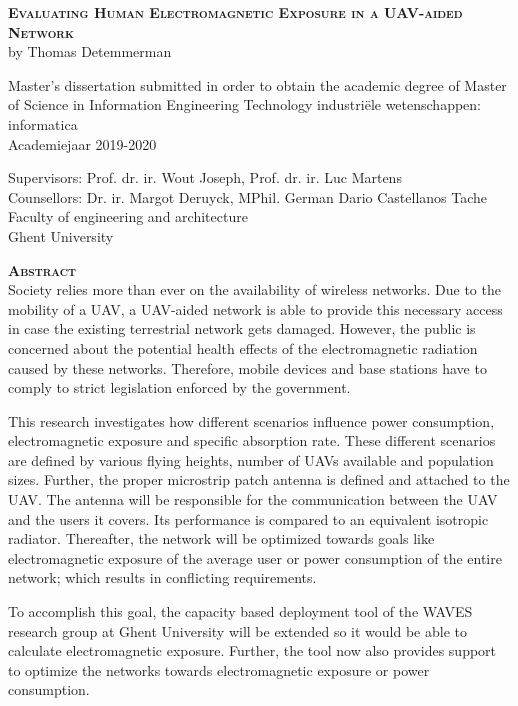 \begin{center}
\textsc{\textbf{\Huge Evaluating Human Electromagnetic Exposure in a UAV-aided Network}}\\
by Thomas Detemmerman

Master's dissertation submitted in order to obtain the academic degree of Master of Science in Information Engineering Technology
industri\"ele wetenschappen: informatica\\
Academiejaar 2019-2020

Supervisors: Prof. dr. ir. Wout Joseph, Prof. dr. ir. Luc Martens\\
Counsellors: Dr. ir. Margot Deruyck, MPhil. German Dario Castellanos Tache\\
Faculty of engineering and architecture\\
Ghent University
\end{center}
\textsc{\textbf{\LARGE Abstract}}\\
Society relies more than ever on the availability of wireless networks.
Due to the mobility of a UAV, a UAV-aided network is able to provide this necessary access in case the existing terrestrial network gets damaged.
However,  the public is 
concerned about the potential health effects of the electromagnetic radiation caused by these networks.
Therefore, mobile devices and base stations have to comply to strict legislation enforced by the government.

This research investigates how different scenarios influence power consumption, electromagnetic exposure and specific absorption rate.
These different scenarios are defined by various flying heights, number of UAVs available and population sizes. Further, 
the proper microstrip patch antenna is defined and attached to the UAV. 
The antenna will be responsible for the communication between the UAV and the users it covers.
Its performance is compared to  
an equivalent isotropic radiator.
Thereafter, the network will be optimized towards goals like electromagnetic exposure of the average user or 
power consumption of the entire network; which results in conflicting requirements.

To accomplish this goal, the capacity based deployment tool of the WAVES research group at Ghent University
will be extended so it would be able to calculate electromagnetic exposure.
Further, the tool now also provides support to optimize the networks towards electromagnetic exposure or power consumption.

